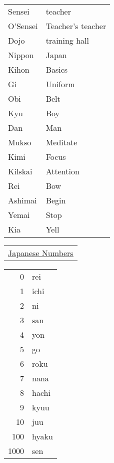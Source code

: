 \documentclass[11pt]{article}
\begin{document}
\begin{parallel}


\begin{center}
\begin{tabular}{ll}
Sensei & teacher\\
O'Sensei & Teacher's teacher\\
Dojo & training hall\\
Nippon & Japan\\
Kihon & Basics\\
Gi & Uniform\\
Obi & Belt\\
Kyu & Boy\\
Dan & Man\\
Mukso & Meditate\\
Kimi & Focus\\
Kilskai & Attention\\
Rei & Bow\\
Ashimai & Begin\\
Yemai & Stop\\
Kia & Yell\\
\end{tabular}
\end{center}

\begin{center}
\begin{tabular}{l}
\href{https://www.linguajunkie.com/japanese/count-in-japanese-1-100}{\uline{Japanese Numbers}}\\
\end{tabular}
\end{center}

\begin{center}
\begin{tabular}{rl}
0 & rei\\
1 & ichi\\
2 & ni\\
3 & san\\
4 & yon\\
5 & go\\
6 & roku\\
7 & nana\\
8 & hachi\\
9 & kyuu\\
10 & juu\\
100 & hyaku\\
1000 & sen\\
\end{tabular}
\end{center}
\end{parallel}
\end{document}
